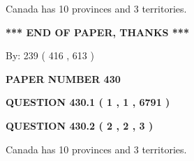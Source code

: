 \documentclass[12pt]{article}
\begin{document}
  
 
 
\noindent{}
 
 
Canada has 10  provinces and 3 territories.
 
 
 
 
   
   
 \vspace{0.2in}
 
   
   
   
   
\vspace{1.0in} 
{\textbf{\large{ *** END OF PAPER, THANKS *** }}} 
   
   
\hspace{1.0in} By: 
 239 ( 416 ,  613 )
   
   
   
   
\newpage 
\setcounter{page}{ 
   430001 } 
   
   
   
   
 {\textbf{ \Large{ PAPER NUMBER  430  }}}
   
   
\vspace{0.2in}
   
   
   
   
   
   
 \vspace{0.2in}
 
 
 
 
   
   
  
\vspace{0.2in}
  
{\textbf{\Large{QUESTION
430.1 
 ( 1 , 1 , 6791 )
}}}
  
  
  
\vspace{0.2in}
  
{\textbf{\Large{QUESTION
430.2 
 ( 2 , 2 , 3 )
}}}
  
  
 
 
\noindent{}
 
 
Canada has 10  provinces and 3 territories.
 
 
 
 
   
   
 \vspace{0.2in}
 
\end{document}

